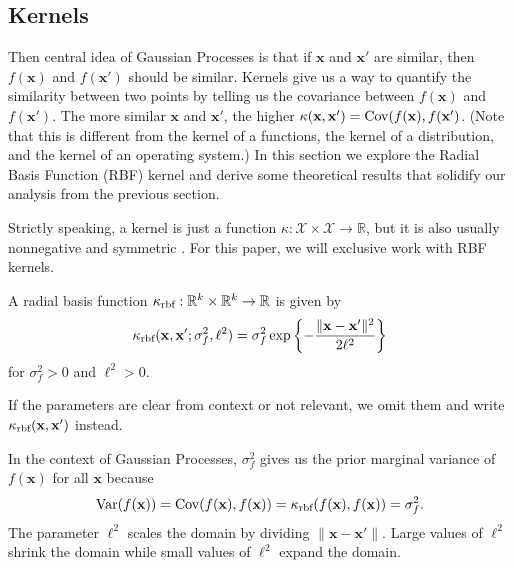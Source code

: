 \subsection{Kernels}

Then central idea of Gaussian Processes is that if $\mathbf{x}$ and $\mathbf{x}'$ are similar, then $f(\mathbf{x})$ and $f(\mathbf{x}')$ should be similar.
Kernels give us a way to quantify the similarity between two points by telling us the covariance between $f(\mathbf{x})$ and $f(\mathbf{x}')$.
The more similar $\mathbf{x}$ and $\mathbf{x}'$, the higher $\kappa(\mathbf{x}, \mathbf{x}') = \operatorname{Cov}(f(\mathbf{x}), f(\mathbf{x}')$.
(Note that this is different from the kernel of a functions, the kernel of a distribution, and the kernel of an operating system.)
In this section we explore the Radial Basis Function (RBF) kernel and derive some theoretical results that solidify our analysis from the previous section.

Strictly speaking, a kernel is just a function $\kappa: \mathcal{X} \times \mathcal{X} \to \mathbb{R}$, but it is also usually nonnegative and symmetric \cite{murphy2012}.
For this paper, we will exclusive work with RBF kernels.

\begin{definition}
    A radial basis function $\kappa_{\text{rbf}}: \mathbb{R}^{k} \times \mathbb{R}^{k} \to \mathbb{R}$
    is given by
    \begin{equation*}
        \kappa_{\text{rbf}}(\mathbf{x}, \mathbf{x}'; \sigma_f^2, \ell^2)
        = \sigma_f^{2} \exp \left\{ - \frac{ \lVert \mathbf{x} - \mathbf{x}' \rVert^2 }{ 2 \ell^2 }\right\}
    \end{equation*}
    for $\sigma_f^2 > 0$ and $\ell^2 > 0$.
    
    If the parameters are clear from context or not relevant, we omit them and write $\kappa_{\text{rbf}}(\mathbf{x}, \mathbf{x}')$ instead.
\end{definition}
In the context of Gaussian Processes, $\sigma_f^2$ gives us the prior marginal variance of $f(\mathbf{x})$ for all $\mathbf{x}$ because
\begin{equation*}
    \operatorname{Var}(f(\mathbf{x})) = \operatorname{Cov}(f(\mathbf{x}), f(\mathbf{x})) = \kappa_{\text{rbf}}(f(\mathbf{x}), f(\mathbf{x})) = \sigma_f^2.
\end{equation*}
The parameter $\ell^2$ scales the domain by dividing $\lVert \mathbf{x} - \mathbf{x}' \rVert$.
Large values of $\ell^2$ shrink the domain while small values of $\ell^2$ expand the domain.

